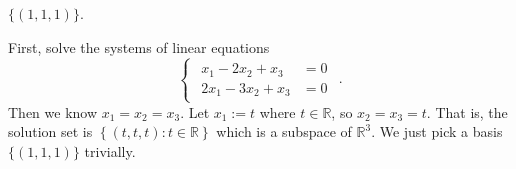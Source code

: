 \begin{Exercise}
\begin{answer}
$\{(1,1,1)\}$.
\end{answer}
\begin{solution}
First, solve the systems of linear equations
$$
\begin{cases}
\begin{aligned}
x_1-2x_2+x_3 &= 0 \\
2x_1-3x_2+x_3 &= 0
\end{aligned}
\end{cases}.
$$
Then we know $x_1 = x_2 = x_3$. Let $x_1 := t$ where $t\in\mathbb{R}$, so $x_2 = x_3 = t$. That is, the solution set is $\left\{ (t,t,t):t\in\mathbb{R} \right\}$ which is a subspace of $\mathbb{R}^3$. We just pick a basis $\{(1,1,1)\}$ trivially.
\end{solution}
\end{Exercise}